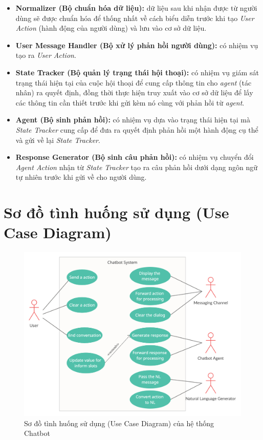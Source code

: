 \begin{itemize}
    \item \textbf{Normalizer (Bộ chuẩn hóa dữ liệu):} dữ liệu sau khi nhận được từ người dùng sẽ được chuẩn hóa để thống nhất về cách biểu diễn trước khi tạo \textit{User Action} (hành động của người dùng) và lưu vào cơ sở dữ liệu.
    \item \textbf{User Message Handler (Bộ xử lý phản hồi người dùng):} có nhiệm vụ tạo ra \textit{User Action}.
    \item \textbf{State Tracker (Bộ quản lý trạng thái hội thoại):} có nhiệm vụ giám sát trạng thái hiện tại của cuộc hội thoại để cung cấp thông tin cho \textit{agent} (tác nhân) ra quyết định, đồng thời thực hiện truy xuất vào cơ sở dữ liệu để lấy các thông tin cần thiết trước khi gửi kèm nó cùng với phản hồi từ \textit{agent}.
    \item \textbf{Agent (Bộ sinh phản hồi):} có nhiệm vụ dựa vào trạng thái hiện tại mà \textit{State Tracker} cung cấp để đưa ra quyết định phản hồi một hành động cụ thể và gửi về lại \textit{State Tracker}.
    \item \textbf{Response Generator (Bộ sinh câu phản hồi):} có nhiệm vụ chuyển đổi \textit{Agent Action} nhận từ \textit{State Tracker} tạo ra câu phản hồi dưới dạng ngôn ngữ tự nhiên trước khi gửi về cho người dùng.
\end{itemize}

\section{Sơ đồ tình huống sử dụng (Use Case Diagram)}

\begin{center}
    \begin{figure}[h!]
        \begin{center}
         \includegraphics[scale=0.25]{chapter4/img/use_case.png}
        \end{center}
        \caption{Sơ đồ tình huống sử dụng (Use Case Diagram) của hệ thống Chatbot}
        \label{fig:usecase}
    \end{figure}
\end{center}

